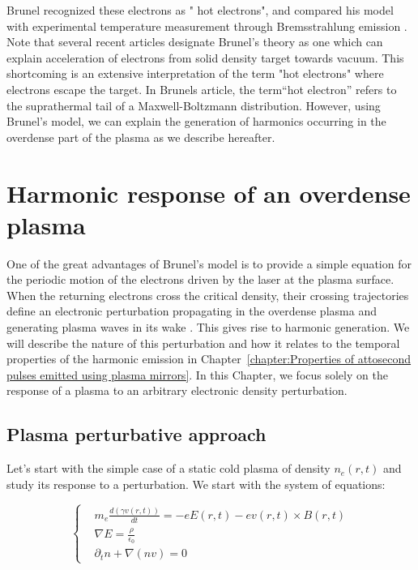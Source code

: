 \noindent Brunel recognized these electrons as " hot electrons", and compared his model with experimental temperature measurement through Bremsstrahlung emission \cite{bach1983intensity,priedhorsky1981hard,enright1979superthermal}.
Note that several recent articles designate Brunel's theory as one which can explain acceleration of electrons from solid density target towards vacuum. This shortcoming is an extensive interpretation of the term "hot electrons" where electrons escape the target. In Brunels article, the term``hot electron'' refers to the suprathermal tail of a Maxwell-Boltzmann distribution. 
However, using Brunel's model, we can explain the generation of harmonics occurring in the overdense part of the plasma as we describe hereafter.




\section{Harmonic response of an overdense plasma}
\label{section:Harmonic plasma response to Brunel electrons}

One of the great advantages of Brunel's model is to provide a simple equation for the periodic motion of the electrons driven by the laser at the plasma surface. When the returning electrons cross the critical density, their crossing trajectories define an electronic perturbation propagating in the overdense plasma and generating plasma waves in its wake \cite{TheseCedric,TheseArnaud,Thaury2007}. This gives rise to harmonic generation. We will describe the nature of this perturbation and how it relates to the temporal properties of the harmonic emission in Chapter~\ref{chapter:Properties of attosecond pulses emitted using plasma mirrors}. In this Chapter, we focus solely on the response of a plasma to an arbitrary electronic density perturbation.



\subsection{Plasma perturbative approach}
\label{subsection:Plasma perturbative approach}

Let's start with the simple case of a static cold plasma of density $n_e(r,t)$ and study its response to a perturbation. We start with the system of equations:

\begin{equation}
  \left\{
      \begin{aligned}
     &m_e \frac{d(\gamma v(r,t))}{dt} = -e E(r,t) - e v(r,t)\times B(r,t) \\
     &\nabla E =  \frac{\rho}{\epsilon_0}\\
    & \partial_t n + \nabla(nv) = 0
      \end{aligned}
    \right.
\label{eq:PlasmonEquation}
\end{equation}



